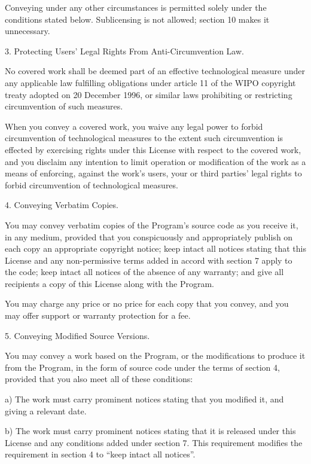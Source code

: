   Conveying under any other circumstances is permitted solely under
the conditions stated below.  Sublicensing is not allowed; section 10
makes it unnecessary.

  3. Protecting Users' Legal Rights From Anti-Circumvention Law.

  No covered work shall be deemed part of an effective technological
measure under any applicable law fulfilling obligations under article
11 of the WIPO copyright treaty adopted on 20 December 1996, or
similar laws prohibiting or restricting circumvention of such
measures.

  When you convey a covered work, you waive any legal power to forbid
circumvention of technological measures to the extent such circumvention
is effected by exercising rights under this License with respect to
the covered work, and you disclaim any intention to limit operation or
modification of the work as a means of enforcing, against the work's
users, your or third parties' legal rights to forbid circumvention of
technological measures.

  4. Conveying Verbatim Copies.

  You may convey verbatim copies of the Program's source code as you
receive it, in any medium, provided that you conspicuously and
appropriately publish on each copy an appropriate copyright notice;
keep intact all notices stating that this License and any
non-permissive terms added in accord with section 7 apply to the code;
keep intact all notices of the absence of any warranty; and give all
recipients a copy of this License along with the Program.

  You may charge any price or no price for each copy that you convey,
and you may offer support or warranty protection for a fee.

  5. Conveying Modified Source Versions.

  You may convey a work based on the Program, or the modifications to
produce it from the Program, in the form of source code under the
terms of section 4, provided that you also meet all of these conditions:

    a) The work must carry prominent notices stating that you modified
    it, and giving a relevant date.

    b) The work must carry prominent notices stating that it is
    released under this License and any conditions added under section
    7.  This requirement modifies the requirement in section 4 to
    ``keep intact all notices''.

